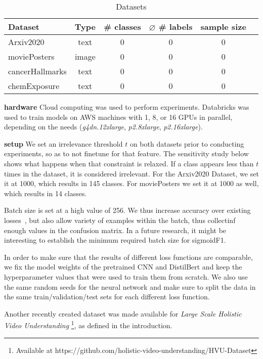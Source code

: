 \begin{table}
\caption{Datasets}
\label{tab:arxiv2020}  
\centering
\begin{tabular}{l ccccc}
\toprule
Dataset & Type & \# classes & $\varnothing$ \# labels & sample size\\
\midrule
Arxiv2020 & text & 0 & 0 & 0\\ 
moviePosters & image & 0 & 0 & 0\\
cancerHallmarks & text & 0 & 0 & 0\\
chemExposure & text & 0 & 0 & 0\\
\bottomrule
\end{tabular}
\end{table}




\textbf{hardware}
Cloud computing was used to perform experiments. Databricks was used to train models on AWS machines with 1, 8, or 16 GPUs in parallel, depending on the needs (\textit{g4dn.12xlarge}, \textit{p2.8xlarge}, \textit{p2.16xlarge}).


\textbf{setup}
We set an irrelevance threshold $t$ on both datasets prior to conducting experiments, so as to not finetune for that feature. The sensitivity study below shows what happens when that constraint is relaxed. If a class appears less than $t$ times in the dataset, it is considered irrelevant. For the Arxiv2020 Dataset, we set it at 1000, which results in 145 classes. For moviePosters we set it at 1000 as well, which results in 14 classes.

Batch size is set at a high value of 256. We thus increase accuracy over existing losses~\cite{bigBS}, but also allow variety of examples within the batch, thus collectinf enough values in the confusion matrix. In a future research, it might be interesting to establish the minimum required batch size for sigmoidF1.

In order to make sure that the results of different loss functions are comparable, we fix the model weights of the pretrained CNN and DistilBert and keep the hyperparameter values that were used to train them from scratch. We also use the same random seeds for the neural network and make sure to split the data in the same train/validation/test sets for each different loss function.


Another recently created dataset was made available for \emph{Large Scale Holistic Video Understanding} \cite{holisticVideoData} \footnote{Available at https://github.com/holistic-video-understanding/HVU-Dataset}, as defined in the introduction.

